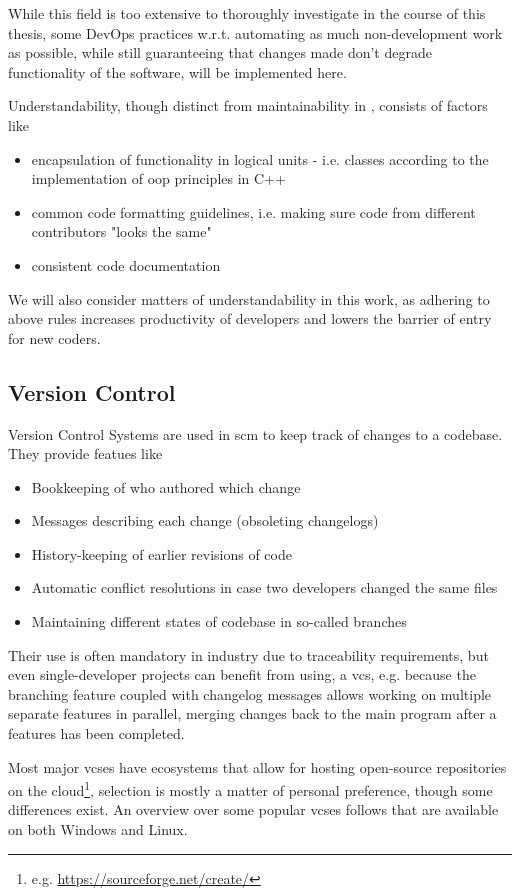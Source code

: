While this field is too extensive to thoroughly investigate in the course of this thesis, some DevOps practices w.r.t. automating as much non-development work as possible, while still guaranteeing that changes made don't degrade functionality of the software, will be implemented here. 

Understandability, though distinct from maintainability in \citet{Bray1997}, consists of factors like 
\begin{itemize}
	\item encapsulation of functionality in logical units - i.e. classes according to the implementation of \gls{oop} principles in C++
	\item common code formatting guidelines, i.e. making sure code from different contributors "looks the same"
	\item consistent code documentation
\end{itemize}
We will also consider matters of understandability in this work, as adhering to above rules increases productivity of developers and lowers the barrier of entry for new coders.

\subsection{Version Control}
\gls{Version Control System}s  are used in \gls{scm} to keep track of changes to a codebase. They provide featues like
\begin{itemize}
	\item Bookkeeping of who authored which change
	\item Messages describing each change (obsoleting changelogs)
	\item History-keeping of earlier revisions of code
	\item Automatic conflict resolutions in case two developers changed the same files
	\item Maintaining different states of codebase in so-called branches
\end{itemize}

Their use is often mandatory in industry due to traceability requirements, but even single-developer projects can benefit from using, a \gls{vcs}, e.g. because the branching feature coupled with changelog messages allows working on multiple separate features in parallel, merging changes back to the main program after a features has been completed. 

Most major \gls{vcs}es have ecosystems that allow for hosting open-source repositories on the \gls{cloud}\footnote{e.g. \url{https://sourceforge.net/create/}}, selection is mostly a matter of personal preference, though some differences exist.
An overview over some popular \gls{vcs}es follows that are available on both Windows and Linux.

